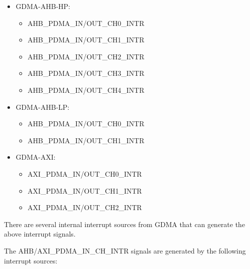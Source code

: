 \documentclass[main\_\_EN.tex]{subfiles}
\begin{document}
    \begin{itemize}
        \item GDMA-AHB-HP:
            \begin{itemize}
                \item AHB\_PDMA\_IN/OUT\_CH0\_INTR
                \item AHB\_PDMA\_IN/OUT\_CH1\_INTR
                \item AHB\_PDMA\_IN/OUT\_CH2\_INTR
                \item AHB\_PDMA\_IN/OUT\_CH3\_INTR
                \item AHB\_PDMA\_IN/OUT\_CH4\_INTR
            \end{itemize}
        \item GDMA-AHB-LP:
            \begin{itemize}
                \item AHB\_PDMA\_IN/OUT\_CH0\_INTR
                \item AHB\_PDMA\_IN/OUT\_CH1\_INTR
            \end{itemize}
        \item GDMA-AXI:
            \begin{itemize}
                \item AXI\_PDMA\_IN/OUT\_CH0\_INTR
                \item AXI\_PDMA\_IN/OUT\_CH1\_INTR
                \item AXI\_PDMA\_IN/OUT\_CH2\_INTR
            \end{itemize}
    \end{itemize}

There are several internal interrupt sources from GDMA that can generate the above interrupt signals.

The AHB/AXI\_PDMA\_IN\_CH\_INTR signals are generated by the following interrupt sources:
\end{document}
